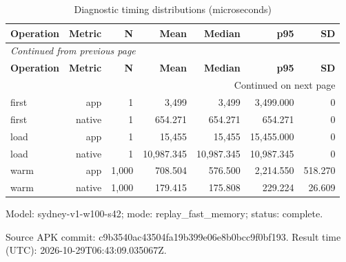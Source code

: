 \documentclass[10pt,a4paper]{article}
\begin{document}
\begingroup\small\setlength{\tabcolsep}{4pt}\renewcommand{\arraystretch}{1.12}
\begin{longtable}{@{}lrrrrrr@{}}
\caption{Diagnostic timing distributions (microseconds)}\\
\toprule
\textbf{Operation} & \textbf{Metric} & \textbf{N} & \textbf{Mean} & \textbf{Median} & \textbf{p95} & \textbf{SD} \\
\midrule\endfirsthead
\multicolumn{7}{l}{\small\itshape Continued from previous page}\\
\toprule
\textbf{Operation} & \textbf{Metric} & \textbf{N} & \textbf{Mean} & \textbf{Median} & \textbf{p95} & \textbf{SD} \\
\midrule\endhead
\midrule\multicolumn{7}{r}{\small Continued on next page}\\\endfoot
\bottomrule\endlastfoot
first & app & 1 & 3,499 & 3,499 & 3,499.000 & 0 \\
first & native & 1 & 654.271 & 654.271 & 654.271 & 0 \\
load & app & 1 & 15,455 & 15,455 & 15,455.000 & 0 \\
load & native & 1 & 10,987.345 & 10,987.345 & 10,987.345 & 0 \\
warm & app & 1,000 & 708.504 & 576.500 & 2,214.550 & 518.270 \\
warm & native & 1,000 & 179.415 & 175.808 & 229.224 & 26.609 \\
\end{longtable}\endgroup
Model:\allowbreak{} sydney-v1-w100-s42; mode:\allowbreak{} replay\_\allowbreak{}fast\_\allowbreak{}memory; status:\allowbreak{} complete.

Source APK commit:\allowbreak{} c9b3540ac43504fa\allowbreak{}19b399e06e8b0bcc\allowbreak{}9f0bf193. Result time (UTC):\allowbreak{} 2026-10-29T06:\allowbreak{}43:\allowbreak{}09.035067Z.
\end{document}
